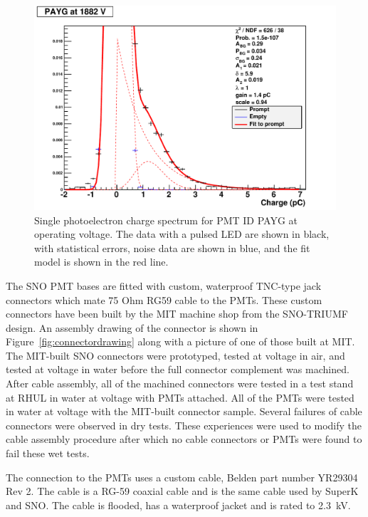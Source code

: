 \documentclass[pdftex]{JINST}
\begin{document}
\begin{figure}[ht]
\begin{center}
\includegraphics[width=4.5in]{graphics/PAYG_singlePE.pdf}
\caption{Single photoelectron charge spectrum for PMT ID PAYG at operating voltage. The data with a pulsed LED are shown in black, with statistical errors, noise data are shown in blue, and the fit model is shown in the red line.
\label{fig:pmt_spe_q}}
\end{center}
\end{figure}

The SNO PMT bases are fitted with custom, waterproof TNC-type jack
connectors which mate 75 Ohm RG59 cable to the PMTs. These custom
connectors have been built by the MIT machine shop from the SNO-TRIUMF
design. An assembly drawing of the connector is shown in
Figure~\ref{fig:connectordrawing} along with a picture of one of those
built at MIT. The MIT-built SNO
connectors were prototyped, tested at voltage in air, and tested at
voltage in water before the full connector complement was machined.
After cable assembly, all of the machined connectors were tested in
a test stand at RHUL in water at voltage with PMTs attached. All of the
PMTs were tested in water at voltage with the MIT-built connector
sample. Several failures of cable connectors were observed in dry
tests. These experiences were used to modify the cable assembly
procedure after which no cable connectors or PMTs were found to fail
these wet tests.


The connection to the PMTs uses a custom cable, Belden part number YR29304 Rev 2. The cable is a
RG-59 coaxial cable and is the same cable used by SuperK and SNO.
The cable is flooded, has a waterproof jacket and is rated to 2.3~kV.
\end{document}
